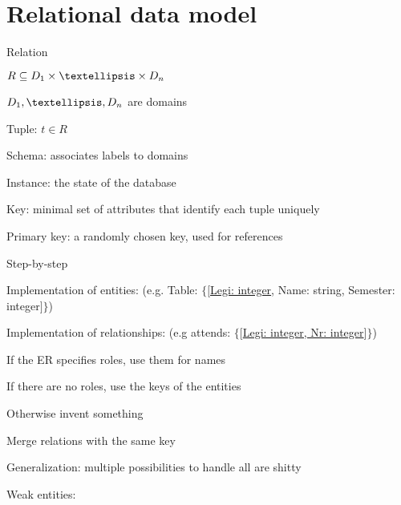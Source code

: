 \section{Relational data model}
\enumstart
	\item Relation
	\enumstart
		\item $R \subseteq D_1 \times \ddd \times D_n$
		\item $D_1, \ddd, D_n$ are domains
	\enumend
	\item Tuple: $t \in R$
	\item Schema: associates labels to domains
	\item Instance: the state of the database
	\item Key: minimal set of attributes that identify each tuple uniquely
	\item Primary key: a randomly chosen key, used for references
	\item Step-by-step
	\enumstart
		\item Implementation of entities: (e.g. Table: $\{[$\underline{Legi: integer}, Name: string, Semester: integer$]\}$)
		\item Implementation of relationships: (e.g attends: $\{[$\underline{Legi: integer, Nr: integer}$]\}$)
		\enumstart
			\item If the ER specifies roles, use them for names
			\item If there are no roles, use the keys of the entities
			\item Otherwise invent something
		\enumend
		\item Merge relations with the same key
		\item Generalization: multiple possibilities to handle \arrow all are shitty
		\item Weak entities: 
	\enumend
\enumend

